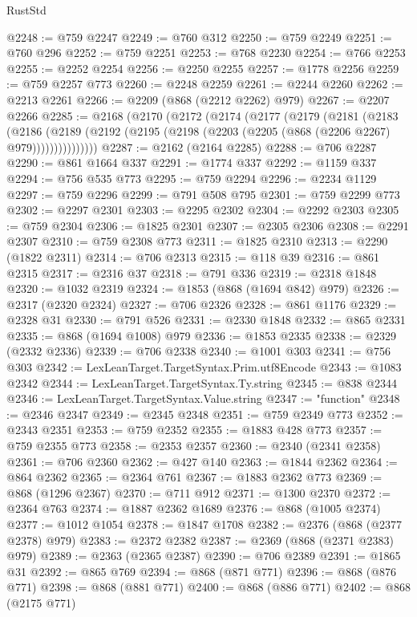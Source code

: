 \begin{lexlean}{RustStd}
\begin{coremodule}
@2248 := @759 @2247
@2249 := @760 @312
@2250 := @759 @2249
@2251 := @760 @296
@2252 := @759 @2251
@2253 := @768 @2230
@2254 := @766 @2253
@2255 := @2252 @2254
@2256 := @2250 @2255
@2257 := @1778 @2256
@2259 := @759 @2257 @773
@2260 := @2248 @2259
@2261 := @2244 @2260
@2262 := @2213 @2261
@2266 := @2209 (@868 (@2212 @2262) @979)
@2267 := @2207 @2266
@2285 := @2168
    (@2170
      (@2172
        (@2174
          (@2177
            (@2179
              (@2181
                (@2183
                  (@2186
                    (@2189
                      (@2192 (@2195 (@2198 (@2203 (@2205 (@868 (@2206 @2267) @979)))))))))))))))
@2287 := @2162 (@2164 @2285)
@2288 := @706 @2287
@2290 := @861 @1664 @337
@2291 := @1774 @337
@2292 := @1159 @337
@2294 := @756 @535 @773
@2295 := @759 @2294
@2296 := @2234 @1129
@2297 := @759 @2296
@2299 := @791 @508 @795
@2301 := @759 @2299 @773
@2302 := @2297 @2301
@2303 := @2295 @2302
@2304 := @2292 @2303
@2305 := @759 @2304
@2306 := @1825 @2301
@2307 := @2305 @2306
@2308 := @2291 @2307
@2310 := @759 @2308 @773
@2311 := @1825 @2310
@2313 := @2290 (@1822 @2311)
@2314 := @706 @2313
@2315 := @118 @39
@2316 := @861 @2315
@2317 := @2316 @37
@2318 := @791 @336
@2319 := @2318 @1848
@2320 := @1032 @2319
@2324 := @1853 (@868 (@1694 @842) @979)
@2326 := @2317 (@2320 @2324)
@2327 := @706 @2326
@2328 := @861 @1176
@2329 := @2328 @31
@2330 := @791 @526
@2331 := @2330 @1848
@2332 := @865 @2331
@2335 := @868 (@1694 @1008) @979
@2336 := @1853 @2335
@2338 := @2329 (@2332 @2336)
@2339 := @706 @2338
@2340 := @1001 @303
@2341 := @756 @303
@2342 := LexLeanTarget.TargetSyntax.Prim.utf8Encode
@2343 := @1083 @2342
@2344 := LexLeanTarget.TargetSyntax.Ty.string
@2345 := @838 @2344
@2346 := LexLeanTarget.TargetSyntax.Value.string
@2347 := "function"
@2348 := @2346 @2347
@2349 := @2345 @2348
@2351 := @759 @2349 @773
@2352 := @2343 @2351
@2353 := @759 @2352
@2355 := @1883 @428 @773
@2357 := @759 @2355 @773
@2358 := @2353 @2357
@2360 := @2340 (@2341 @2358)
@2361 := @706 @2360
@2362 := @427 @140
@2363 := @1844 @2362
@2364 := @864 @2362
@2365 := @2364 @761
@2367 := @1883 @2362 @773
@2369 := @868 (@1296 @2367)
@2370 := @711 @912
@2371 := @1300 @2370
@2372 := @2364 @763
@2374 := @1887 @2362 @1689
@2376 := @868 (@1005 @2374)
@2377 := @1012 @1054
@2378 := @1847 @1708
@2382 := @2376 (@868 (@2377 @2378) @979)
@2383 := @2372 @2382
@2387 := @2369 (@868 (@2371 @2383) @979)
@2389 := @2363 (@2365 @2387)
@2390 := @706 @2389
@2391 := @1865 @31
@2392 := @865 @769
@2394 := @868 (@871 @771)
@2396 := @868 (@876 @771)
@2398 := @868 (@881 @771)
@2400 := @868 (@886 @771)
@2402 := @868 (@2175 @771)

\end{coremodule}
\end{lexlean}

